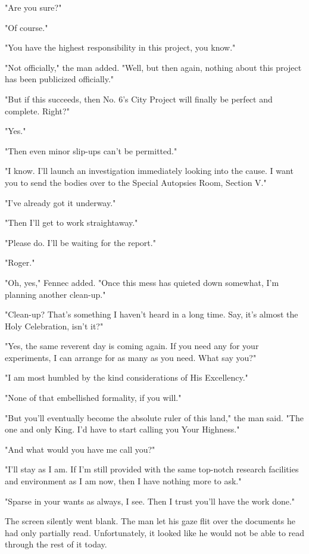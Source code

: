 "Are you sure?"

"Of course."

"You have the highest responsibility in this project, you know."

"Not officially," the man added. "Well, but then again, nothing about
this project has been publicized officially."

"But if this succeeds, then No. 6's City Project will finally be perfect
and complete. Right?"

"Yes."

"Then even minor slip-ups can't be permitted."

"I know. I'll launch an investigation immediately looking into the
cause. I want you to send the bodies over to the Special Autopsies Room,
Section V."

"I've already got it underway."

"Then I'll get to work straightaway."

"Please do. I'll be waiting for the report."

"Roger."

"Oh, yes," Fennec added. "Once this mess has quieted down somewhat, I'm
planning another clean-up."

"Clean-up? That's something I haven't heard in a long time. Say, it's
almost the Holy Celebration, isn't it?"

"Yes, the same reverent day is coming again. If you need any for your
experiments, I can arrange for as many as you need. What say you?"

"I am most humbled by the kind considerations of His Excellency."

"None of that embellished formality, if you will."

"But you'll eventually become the absolute ruler of this land," the man
said. "The one and only King. I'd have to start calling you Your
Highness."

"And what would you have me call you?"

"I'll stay as I am. If I'm still provided with the same top-notch
research facilities and environment as I am now, then I have nothing
more to ask."

"Sparse in your wants as always, I see. Then I trust you'll have the
work done."

The screen silently went blank. The man let his gaze flit over the
documents he had only partially read. Unfortunately, it looked like he
would not be able to read through the rest of it today.

